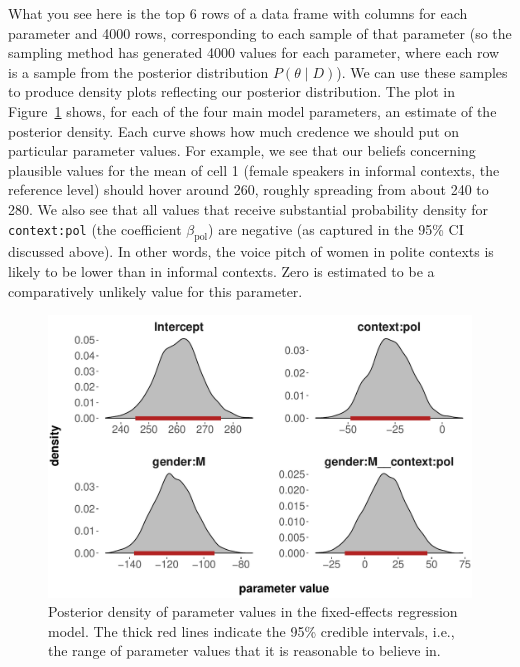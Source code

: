\documentclass[nobib]{tufte-handout}
\begin{document}
What you see here is the top 6 rows of a data frame with columns for each parameter and 4000 rows, corresponding to each sample of that parameter (so the sampling method has generated 4000 values for each parameter, where each row is a sample from the posterior distribution $P(\theta \mid D)$).
%
%
We can use these samples to produce density plots reflecting our posterior distribution. The plot in Figure~\ref{fig:Posteriors_FE}
shows, for each of the four main model parameters, an estimate of the posterior density. Each
curve shows how much credence we should put on particular parameter values. For example, we see
that our beliefs concerning plausible values for the mean of cell 1 (female speakers in informal
contexts, the reference level) should hover around 260, roughly spreading from about 240 to 280.
We also see that all values that receive substantial probability density for \texttt{context:pol} (the coefficient $\beta_{\text{pol}}$) are negative (as captured in the 95\% CI discussed above). In other words,  the voice pitch of women in polite contexts is likely to be lower than in informal contexts. Zero is estimated to be a comparatively unlikely value for this parameter.

\begin{figure}
  \centering
  \includegraphics[width=\textwidth]{pics/posterior_density_FE.pdf}
  \caption[Posterior over coefficients in fixed-effects model]{Posterior density of parameter
    values in the fixed-effects regression model. The thick red lines indicate the 95\%
    credible intervals, i.e., the range of parameter values that it is reasonable to believe
    in.}
  \label{fig:Posteriors_FE}
\end{figure}
\end{document}
